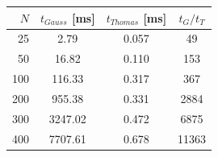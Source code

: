 \begin{tabular}{r cc c}
\toprule
$N$ & $t_{Gauss}$ [ms] & $t_{Thomas}$ [ms] & $t_G/t_T$\\
\midrule
25 & 2.79 & 0.057 & 49\\
50 & 16.82 & 0.110 & 153\\
100 & 116.33 & 0.317 & 367\\
200 & 955.38 & 0.331 & 2884\\
300 & 3247.02 & 0.472 & 6875\\
400 & 7707.61 & 0.678 & 11363\\
\bottomrule
\end{tabular}
